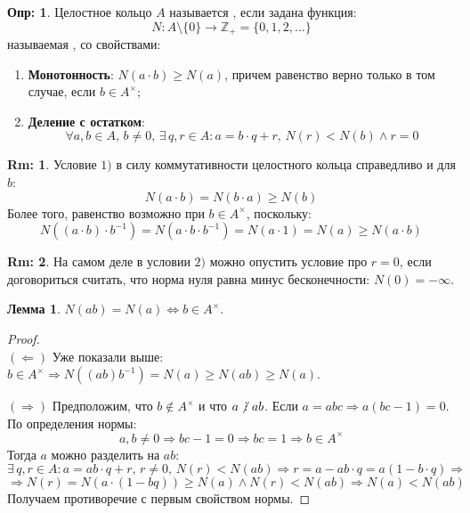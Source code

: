 \documentclass[12pt]{article}
\newcommand{\MZ}{\mathbb{Z}}
\theoremstyle{definition}
\newtheorem{defn}{Опр:}
\newtheorem{rem}{Rm:}
\newtheorem{lemma}{Лемма}
\DeclareRobustCommand{\divby}{%
	\mathrel{\text{\vbox{\baselineskip.65ex\lineskiplimit0pt\hbox{.}\hbox{.}\hbox{.}}}}%
}
\DeclareRobustCommand{\ndivby}{\mkern-1mu\not\mathrel{\mkern4.5mu\divby}\mkern1mu}
\begin{document}
\begin{defn}
	Целостное кольцо $A$ называется , если задана функция: 
	$$
		N \colon A\setminus \{0\} \rightarrow \MZ_{+} = \{0,1,2, \dotsc\}
	$$ 
	называемая , со свойствами:
	\begin{enumerate}[label=\arabic*)]
		\item \textbf{Монотонность}: $N(a{\cdot}b) \geq N(a)$, причем равенство верно только в том случае, если $b\in A^{\times}$;
		\item \textbf{Деление с остатком}: 
		$$
			\forall a,b \in A, \, b \neq 0, \, \exists \, q,r \in A \colon a = b{\cdot}q + r, \, N(r) < N(b) \wedge r = 0
		$$
	\end{enumerate}
\end{defn}
\begin{rem}
	Условие $1)$ в силу коммутативности целостного кольца справедливо и для $b$: 
	$$
		N(a{\cdot}b) = N(b{\cdot}a) \geq N(b)
	$$
	Более того, равенство возможно при $b \in A^\times$, поскольку: 
	$$
		N((a{\cdot}b){\cdot}b^{-1}) = N(a{\cdot}b{\cdot}b^{-1}) = N(a{\cdot}1) = N(a) \geq N(a{\cdot}b)
	$$
\end{rem}
\begin{rem}
	На самом деле в условии $2)$ можно опустить условие про $r = 0$, если договориться считать, что норма нуля равна минус бесконечности: $N(0) = - \infty$.
\end{rem}
\begin{lemma}
	$N(ab) = N(a) \Leftrightarrow b \in A^{\times}$.
\end{lemma}
\begin{proof}\hfill\\
	$(\Leftarrow)$ Уже показали выше: $b \in A^{\times} \Rightarrow N((ab)b^{-1}) = N(a) \geq N(ab) \geq N(a)$.
	
	$(\Rightarrow)$ Предположим, что $b \not\in A^{\times}$ и что $a \ndivby ab$. Если $a = abc \Rightarrow a(bc - 1) = 0$. По определения нормы: 
	$$
		a,b \neq 0 \Rightarrow bc - 1 = 0\Rightarrow bc = 1 \Rightarrow b \in A^{\times}
	$$
	Тогда $a$ можно разделить на $ab$:
	$$
		\exists \, q, r \in A \colon a = ab{\cdot}q + r, \, r \neq 0, \, N(r) < N(ab) \Rightarrow r = a - ab{\cdot}q = a(1 - b{\cdot}q) \Rightarrow
	$$
	$$
		\Rightarrow N(r) = N(a{\cdot}(1 - bq)) \geq N(a) \wedge N(r) < N(ab) \Rightarrow N(a) < N(ab)
	$$
	Получаем противоречие с первым свойством нормы.
\end{proof}
\end{document}
